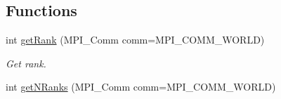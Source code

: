 \subsection*{Functions}
\begin{DoxyCompactItemize}
\item 
\hypertarget{namespaceop_1_1mpi_a58f180d9f50939fade5ef8a1b342cd59}{int \hyperlink{namespaceop_1_1mpi_a58f180d9f50939fade5ef8a1b342cd59}{get\-Rank} (M\-P\-I\-\_\-\-Comm comm=M\-P\-I\-\_\-\-C\-O\-M\-M\-\_\-\-W\-O\-R\-L\-D)}\label{namespaceop_1_1mpi_a58f180d9f50939fade5ef8a1b342cd59}

\begin{DoxyCompactList}\small\item\em Get rank. \end{DoxyCompactList}\item 
\hypertarget{namespaceop_1_1mpi_a0cfa337a690952eb35837bd83213f365}{int \hyperlink{namespaceop_1_1mpi_a0cfa337a690952eb35837bd83213f365}{get\-N\-Ranks} (M\-P\-I\-\_\-\-Comm comm=M\-P\-I\-\_\-\-C\-O\-M\-M\-\_\-\-W\-O\-R\-L\-D)}\label{namespaceop_1_1mpi_a0cfa337a690952eb35837bd83213f365}


\end{DoxyCompactItemize}
